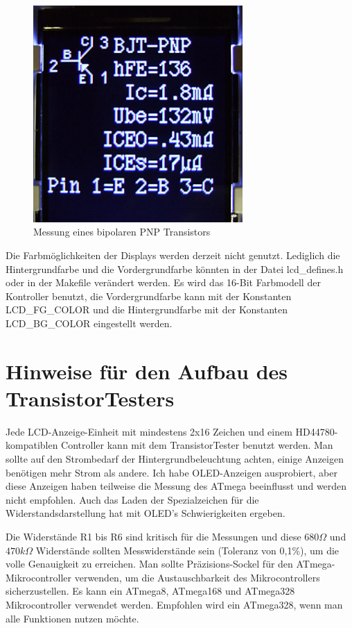 \begin{figure}[H]
\centering
\includegraphics[width=8cm]{../PNG/Color_PNP_ILI9163.jpg}
\caption{Messung eines bipolaren PNP Transistors}
\label{fig:Color_PNP}
\end{figure}

Die Farbmöglichkeiten der Displays werden derzeit nicht genutzt. Lediglich die Hintergrundfarbe
und die Vordergrundfarbe könnten in der Datei lcd\_defines.h oder in der Makefile verändert werden.
Es wird das 16-Bit Farbmodell der Kontroller benutzt, die Vordergrundfarbe kann mit der Konstanten
LCD\_FG\_COLOR und die Hintergrundfarbe mit der Konstanten LCD\_BG\_COLOR eingestellt werden.

\section{Hinweise für den Aufbau des TransistorTesters}
Jede LCD-Anzeige-Einheit mit mindestens 2x16 Zeichen und einem HD44780-kompatiblen Controller kann mit
dem TransistorTester benutzt werden.
Man sollte auf den Strombedarf der Hintergrundbeleuchtung achten, einige Anzeigen benötigen
mehr Strom als andere.
Ich habe OLED-Anzeigen ausprobiert, aber diese Anzeigen haben teilweise die Messung des
ATmega beeinflusst und werden nicht empfohlen. Auch das Laden der Spezialzeichen für die 
Widerstandsdarstellung hat mit OLED's Schwierigkeiten ergeben.

Die Widerstände R1 bis R6 sind kritisch für die Messungen und diese \(680\Omega\) und
\(470k\Omega\) Widerstände sollten Messwiderstände sein (Toleranz von 0,1\%), um 
die volle Genauigkeit zu erreichen.
Man sollte Präzisions-Sockel für den ATmega-Mikrocontroller verwenden, um
die Austauschbarkeit des Mikrocontrollers sicherzustellen.
Es kann ein ATmega8, ATmega168 und ATmega328 Mikrocontroller verwendet werden.
Empfohlen wird ein ATmega328, wenn man alle Funktionen nutzen möchte.

